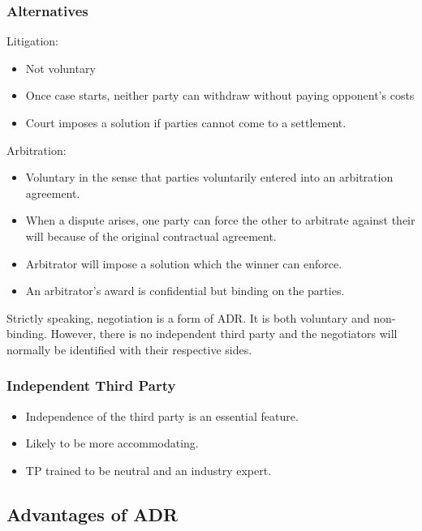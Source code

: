\documentclass[
]{article}
\providecommand{\tightlist}{%
  \setlength{\itemsep}{0pt}\setlength{\parskip}{0pt}}
\begin{document}
\hypertarget{alternatives}{%
\subsubsection{Alternatives}\label{alternatives}}

Litigation:

\begin{itemize}
\tightlist
\item
  Not voluntary
\item
  Once case starts, neither party can withdraw without paying opponent's
  costs
\item
  Court imposes a solution if parties cannot come to a settlement.
\end{itemize}

Arbitration:

\begin{itemize}
\tightlist
\item
  Voluntary in the sense that parties voluntarily entered into an
  arbitration agreement.
\item
  When a dispute arises, one party can force the other to arbitrate
  against their will because of the original contractual agreement.
\item
  Arbitrator will impose a solution which the winner can enforce.
\item
  An arbitrator's award is confidential but binding on the parties.
\end{itemize}

Strictly speaking, negotiation is a form of ADR. It is both voluntary
and non-binding. However, there is no independent third party and the
negotiators will normally be identified with their respective sides.

\hypertarget{independent-third-party}{%
\subsubsection{Independent Third Party}\label{independent-third-party}}

\begin{itemize}
\tightlist
\item
  Independence of the third party is an essential feature.
\item
  Likely to be more accommodating.
\item
  TP trained to be neutral and an industry expert.
\end{itemize}

\hypertarget{advantages-of-adr}{%
\subsection{Advantages of ADR}\label{advantages-of-adr}}
\end{document}
